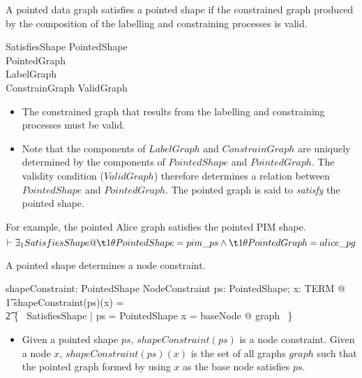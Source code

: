 \documentclass{article}
\begin{document}
A pointed data graph satisfies a pointed shape if the constrained graph produced by the composition of the labelling 
and constraining processes is valid.
\begin{schema}{SatisfiesShape}
	PointedShape \\
	PointedGraph \\
	LabelGraph \\
	ConstrainGraph
\where
	ValidGraph
\end{schema}
\begin{itemize}
\item The constrained graph that results from the labelling and constraining processes must be valid.
\item Note that the components of $LabelGraph$ and $ConstrainGraph$ are uniquely determined by the components
of $PointedShape$ and $PointedGraph$. The validity condition ($ValidGraph$) therefore determines a relation
between $PointedShape$ and $PointedGraph$.
The pointed graph is said to {\em satisfy} the pointed shape.
\end{itemize}

For example, the pointed Alice graph satisfies the pointed PIM shape.
\[\vdash
	\exists_1 SatisfiesShape @ \\
\t1		\theta PointedShape = pim\_ps \land \\
\t1		\theta PointedGraph = alice\_pg
\]

A pointed shape determines a node constraint.
\begin{axdef}
	shapeConstraint: PointedShape \fun NodeConstraint
\where
	\forall ps: PointedShape; x: TERM @ \\
\t1		shapeConstraint(ps)(x) = \\
\t2			\{~ SatisfiesShape | ps = \theta PointedShape \land x = baseNode @ graph ~\}
\end{axdef}
\begin{itemize}
\item Given a pointed shape $ps$, $shapeConstraint(ps)$ is a node constraint. 
Given a node $x$, $shapeConstraint(ps)(x)$ is the set of all graphs $graph$ such that the pointed graph
formed by using $x$ as the base node satisfies $ps$.
\end{itemize}
\end{document}
